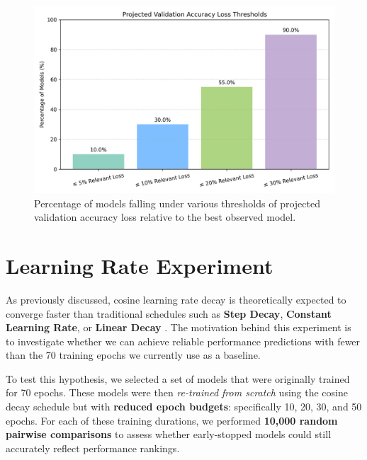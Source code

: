 \begin{figure}[H]
    \centering
    \includegraphics[width=0.85\linewidth]{Pictures/val_accuracy_loss_percentages.png}
    \caption{Percentage of models falling under various thresholds of projected validation accuracy loss relative to the best observed model.}
    \label{fig:performanceStop}
\end{figure}



\section{Learning Rate Experiment}

As previously discussed, cosine learning rate decay is theoretically expected to converge faster than traditional schedules such as \textbf{Step Decay}, \textbf{Constant Learning Rate}, or \textbf{Linear Decay} \cite{li2019exponential}  \cite{kim2021automated}. The motivation behind this experiment is to investigate whether we can achieve reliable performance predictions with fewer than the 70 training epochs we currently use as a baseline.

To test this hypothesis, we selected a set of models that were originally trained for 70 epochs. These models were then \textit{re-trained from scratch} using the cosine decay schedule but with \textbf{reduced epoch budgets}: specifically 10, 20, 30, and 50 epochs. For each of these training durations, we performed \textbf{10,000 random pairwise comparisons} to assess whether early-stopped models could still accurately reflect performance rankings.


